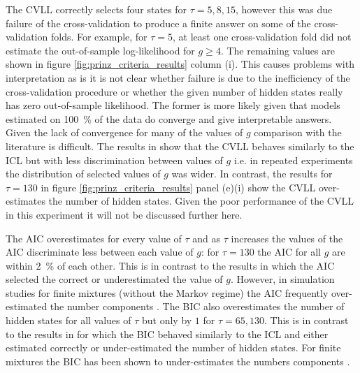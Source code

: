 The CVLL correctly selects four states for $\tau = 5, 8, 15$, however this was due failure of the cross-validation to produce a finite answer on some of the cross-validation folds. For example, for $\tau=5$, at least one cross-validation fold did not estimate the out-of-sample log-likelihood for $g\ge 4$. The remaining values are shown in figure \ref{fig:prinz_criteria_results} column (i). This causes problems with interpretation as is it is not clear whether failure is due to the  inefficiency of the cross-validation procedure or whether the given number of hidden states really has zero out-of-sample likelihood. The former is more likely given that models estimated on \SI{100}{\percent} of the data do converge and give interpretable answers. Given the lack of convergence for many of the values of $g$ comparison with the literature is difficult. The results in \cite{celeuxSelectingHiddenMarkov2008} show that the CVLL behaves similarly to the ICL but with less discrimination between values of $g$ i.e. in repeated experiments the distribution of selected values of $g$ was wider. In contrast, the results for $\tau=130$ in figure \ref{fig:prinz_criteria_results} panel (e)(i) show the CVLL over-estimates the number of hidden states.  Given the poor performance of the CVLL in this experiment it will not be discussed further here. 

The AIC overestimates for every value of $\tau$ and as $\tau$ increases the values of the AIC discriminate less between each value of $g$: for $\tau = 130$ the AIC for all $g$ are within \SI{2}{\percent} of each other. This is in contrast to the results in   \cite{celeuxSelectingHiddenMarkov2008} which the AIC selected the correct or underestimated the value of $g$. However, in simulation studies for finite mixtures (without the Markov regime) the AIC frequently over-estimated the number components \cite{celeuxEntropyCriterionAssessing1996}\cite{soromenho1994comparing}. The BIC also overestimates the number of hidden states for all values of $\tau$ but only by $1$ for $\tau=65, 130$. This is in contrast to the results in \cite{celeuxSelectingHiddenMarkov2008} for which the BIC behaved similarly to the ICL and either estimated correctly or under-estimated the number of hidden states.  For finite mixtures the BIC has been shown to under-estimates the numbers components \cite{biernackiAssessingMixtureModel2000a}. 

